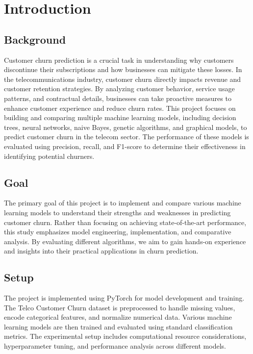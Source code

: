 \section{Introduction}
\subsection{Background}
Customer churn prediction is a crucial task in understanding why customers discontinue their subscriptions and how businesses can mitigate these losses. In the telecommunications industry, customer churn directly impacts revenue and customer retention strategies. By analyzing customer behavior, service usage patterns, and contractual details, businesses can take proactive measures to enhance customer experience and reduce churn rates. This project focuses on building and comparing multiple machine learning models, including decision trees, neural networks, naive Bayes, genetic algorithms, and graphical models, to predict customer churn in the telecom sector. The performance of these models is evaluated using precision, recall, and F1-score to determine their effectiveness in identifying potential churners.

\subsection{Goal}
The primary goal of this project is to implement and compare various machine learning models to understand their strengths and weaknesses in predicting customer churn. Rather than focusing on achieving state-of-the-art performance, this study emphasizes model engineering, implementation, and comparative analysis. By evaluating different algorithms, we aim to gain hands-on experience and insights into their practical applications in churn prediction.

\subsection{Setup}
The project is implemented using PyTorch for model development and training. The Telco Customer Churn dataset is preprocessed to handle missing values, encode categorical features, and normalize numerical data. Various machine learning models are then trained and evaluated using standard classification metrics. The experimental setup includes computational resource considerations, hyperparameter tuning, and performance analysis across different models.
